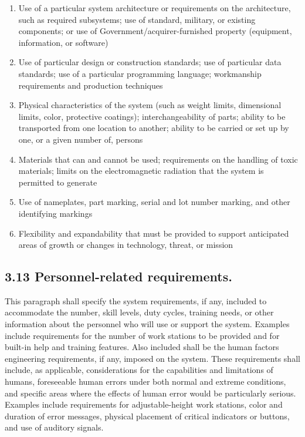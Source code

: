 \begin{enumerate}
\itemsep1pt\parskip0pt
\item
  Use of a particular system architecture or requirements on the
  architecture, such as required subsystems; use of standard, military,
  or existing components; or use of Government/acquirer-furnished
  property (equipment, information, or software)
\item
  Use of particular design or construction standards; use of particular
  data standards; use of a particular programming language; workmanship
  requirements and production techniques
\item
  Physical characteristics of the system (such as weight limits,
  dimensional limits, color, protective coatings); interchangeability of
  parts; ability to be transported from one location to another; ability
  to be carried or set up by one, or a given number of, persons
\item
  Materials that can and cannot be used; requirements on the handling of
  toxic materials; limits on the electromagnetic radiation that the
  system is permitted to generate
\item
  Use of nameplates, part marking, serial and lot number marking, and
  other identifying markings
\item
  Flexibility and expandability that must be provided to support
  anticipated areas of growth or changes in technology, threat, or
  mission
\end{enumerate}

\subsection{3.13 Personnel-related requirements.}

This paragraph shall specify the system requirements, if any, included
to accommodate the number, skill levels, duty cycles, training needs, or
other information about the personnel who will use or support the
system. Examples include requirements for the number of work stations to
be provided and for built-in help and training features. Also included
shall be the human factors engineering requirements, if any, imposed on
the system. These requirements shall include, as applicable,
considerations for the capabilities and limitations of humans,
foreseeable human errors under both normal and extreme conditions, and
specific areas where the effects of human error would be particularly
serious. Examples include requirements for adjustable-height work
stations, color and duration of error messages, physical placement of
critical indicators or buttons, and use of auditory signals.

